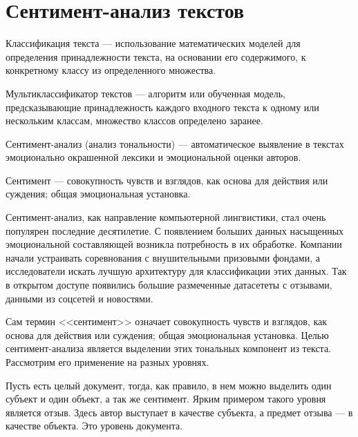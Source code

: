 \section{Сентимент\nobreak-анализ текстов}

\begin{definition}
 Классификация текста --- использование математических моделей для определения принадлежности текста, на основании его содержимого, к конкретному классу из определенного множества.
\end{definition}

\begin{definition}
 Мультиклассификатор текстов --- алгоритм или обученная модель, предсказывающие принадлежность каждого входного текста к одному или нескольким классам, множество классов определено заранее.
\end{definition}

\begin{definition}
 Сентимент-анализ (анализ тональности) --- автоматическое выявление в текстах эмоционально окрашенной лексики и эмоциональной оценки авторов.
\end{definition}

\begin{definition}
 Сентимент --- совокупность чувств и взглядов, как основа для действия или суждения; общая эмоциональная установка.
\end{definition}

\par
Сентимент-анализ, как направление компьютерной лингвистики, стал очень популярен последние десятилетие. С появлением больших данных насыщенных эмоциональной составляющей возникла потребность в их обработке. Компании начали устраивать соревнования с внушительными призовыми фондами, а исследователи искать лучшую архитектуру для классификации этих данных. Так в открытом доступе появились большие размеченные датасететы с отзывами, данными из соцсетей и новостями.

\bigskip\par
Сам термин <<сентимент>> означает совокупность чувств и взглядов, как основа для действия или суждения; общая эмоциональная установка. Целью сентимент-анализа является выделении этих тональных компонент из текста. Рассмотрим его применение на разных уровнях.

\bigskip\par
Пусть есть целый документ, тогда, как правило, в нем можно выделить один субъект и один объект, а так же сентимент. Ярким примером такого уровня является отзыв. Здесь автор выступает в качестве субъекта, а предмет отзыва --- в качестве объекта. Это уровень документа.

